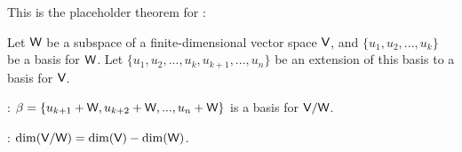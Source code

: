 \begin{additional theorem} \label{athm 1.28}
This is the placeholder theorem for :

Let \(\textsf{W}\) be a subspace of a finite-dimensional vector space \(\textsf{V}\), and \(\{ u_1, u_2, ..., u_k \}\) be a basis for \(\textsf{W}\).
Let \(\{ u_1, u_2, ..., u_k, u_{k + 1}, ..., u_n \}\) be an extension of this basis to a basis for \(\textsf{V}\).

: \(\beta = \{ u_{k + 1} + \textsf{W}, u_{k + 2} + \textsf{W}, ..., u_n + \textsf{W} \}\) is a basis for \(\textsf{V} / \textsf{W}\).

: \(\dim(\textsf{V}/\textsf{W}) = \dim(\textsf{V}) - \dim(\textsf{W})\).
\end{additional theorem}